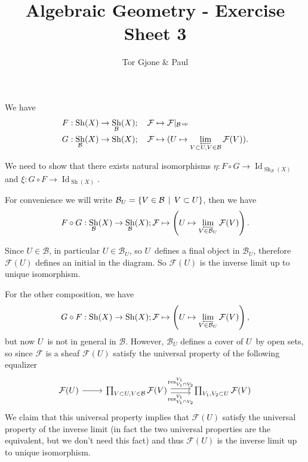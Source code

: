 \documentclass[a4paper,11pt,english]{article}
\title{\textbf{Algebraic Geometry} - Exercise Sheet 3}
\author{Tor Gjone \& Paul}
\DeclareMathOperator{\Sh}{Sh}
\DeclareMathOperator{\op}{^{op}}
\DeclareMathOperator{\Id}{Id}
\DeclareMathOperator{\res}{res}
\newcommand{\B}{\mathcal{B}}
\newcommand{\F}{\mathcal{F}}
\begin{document}
\mmaketitle


\begin{exercise}[2]
We have 
\begin{align*}
F &: \Sh (X) \to \Sh_\B(X) ; \quad \F \mapsto \F|_{\B\op} \\
G &: \Sh_\B (X) \to \Sh(X) ; \quad \F \mapsto (U \mapsto \invlim_{V \subset U, V
\in \B} \F(V)).
\end{align*}

We need to show that there exists natural isomorphisms $\eta : F \circ G \to
\Id_{\Sh_\B(X)}$ and $\xi : G \circ F \to \Id_{\Sh(X)}$.

For convenience we will write $\B_U = \{ V \in \B \q| V \subset U  \}$, then we have 
\begin{equation*}
F \circ G: \Sh_{\B}(X) \to \Sh_{\B}(X); \F \mapsto 
\left(U \mapsto \invlim_{V \in \B_U} \F(V) \right).  
\end{equation*}

Since $U \in \B$, in particular $U \in \B_U$, so $U$ defines a final object in
$\B_U$, therefore $\F(U)$ defines an initial in the diagram. So 
$\F(U)$ is the inverse limit up to unique isomorphism.

For the other composition, we have 
\begin{equation*}
 G \circ F: \Sh(X) \to \Sh(X); \F \mapsto 
\left(U \mapsto \invlim_{V \in \B_U} \F(V) \right), 
\end{equation*}
but now $U$ is not in general in $\B$. However, $\B_U$ defines a cover of $U$ by
open sets, so since $\F$ is a sheaf $\F(U)$ satisfy the universal property of
the following equalizer
\begin{equation}
\begin{tikzcd}
\F(U) \arrow[r] & \prod_{V \subset U, V \in \B} \F(V) 
\arrow[r, shift left, "\res^{V_1}_{V_1\cap V_2}"] 
\arrow[r, shift right, "\res^{V_1}_{V_1\cap V_2}"'] 
& \prod_{V_1, V_2 \subset U} \F(V) 
\end{tikzcd}
\end{equation}
We claim that this universal property implies that $\F(U)$ satisfy the universal
property of the inverse limit (in fact the two universal properties are the
equivalent, but we don't need this fact) and thus $\F(U)$ is the inverse limit
up to unique isomorphism.


\end{exercise}
\end{document}
